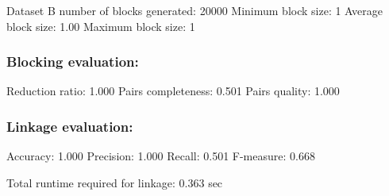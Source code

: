 \documentclass[
  letterpaper,
  DIV=11,
  numbers=noendperiod]{scrartcl}
\begin{document}
Dataset B number of blocks generated: 20000 Minimum block size: 1
Average block size: 1.00 Maximum block size: 1

\hypertarget{blocking-evaluation-8}{%
\subsubsection{Blocking evaluation:}\label{blocking-evaluation-8}}

Reduction ratio: 1.000 Pairs completeness: 0.501 Pairs quality: 1.000

\hypertarget{linkage-evaluation-8}{%
\subsubsection{Linkage evaluation:}\label{linkage-evaluation-8}}

Accuracy: 1.000 Precision: 1.000 Recall: 0.501 F-measure: 0.668

Total runtime required for linkage: 0.363 sec
\end{document}
